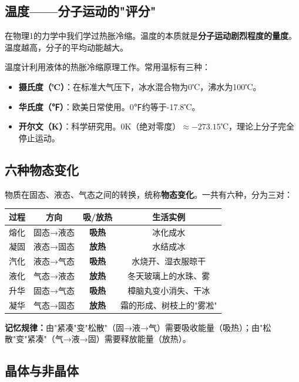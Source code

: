 \documentclass[a4paper,12pt]{ctexart}
\begin{document}
\subsection*{温度——分子运动的"评分"}

在物理1的力学中我们学过热胀冷缩。温度的本质就是\textbf{分子运动剧烈程度的量度}。温度越高，分子的平均动能越大。

温度计利用液体的热胀冷缩原理工作。常用温标有三种：
\begin{itemize}
  \item \textbf{摄氏度（℃）}：在标准大气压下，冰水混合物为0℃，沸水为100℃。
  \item \textbf{华氏度（℉）}：欧美日常使用。0℉约等于-17.8℃。
  \item \textbf{开尔文（K）}：科学研究用。0K（绝对零度）$\approx -273.15$℃，理论上分子完全停止运动。
\end{itemize}

\subsection*{六种物态变化}

物质在固态、液态、气态之间的转换，统称\textbf{物态变化}。一共有六种，分为三对：

\begin{center}
\begin{tabular}{|c|c|c|c|}
\hline
\textbf{过程} & \textbf{方向} & \textbf{吸/放热} & \textbf{生活实例} \\
\hline
熔化 & 固态→液态 & \textbf{吸热} & 冰化成水 \\
凝固 & 液态→固态 & \textbf{放热} & 水结成冰 \\
汽化 & 液态→气态 & \textbf{吸热} & 水烧开、湿衣服晾干 \\
液化 & 气态→液态 & \textbf{放热} & 冬天玻璃上的水珠、雾 \\
升华 & 固态→气态 & \textbf{吸热} & 樟脑丸变小消失、干冰 \\
凝华 & 气态→固态 & \textbf{放热} & 霜的形成、树枝上的"雾凇" \\
\hline
\end{tabular}
\end{center}

\textbf{记忆规律：}由"紧凑"变"松散"（固→液→气）需要吸收能量（吸热）；由"松散"变"紧凑"（气→液→固）需要释放能量（放热）。

\subsection*{晶体与非晶体}
\end{document}
